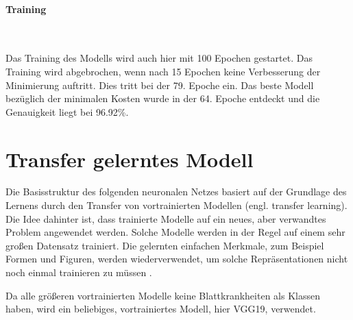\newpage
\paragraph{Training}
~\newline


Das Training des Modells wird auch hier mit 100 Epochen gestartet. Das Training wird abgebrochen, wenn nach 15 Epochen keine Verbesserung der Minimierung auftritt. Dies tritt bei der 79. Epoche ein. Das beste Modell bezüglich der minimalen Kosten wurde in der 64. Epoche entdeckt und die Genauigkeit liegt bei 96.92\%. 


\section{Transfer gelerntes Modell}
\label{sec:transferlearning}


Die Basisstruktur des folgenden neuronalen Netzes basiert auf der Grundlage des Lernens durch den Transfer von vortrainierten Modellen (engl. transfer learning). Die Idee dahinter ist, dass trainierte Modelle auf ein neues, aber verwandtes Problem angewendet werden. Solche Modelle werden in der Regel auf einem sehr großen Datensatz trainiert. Die gelernten einfachen Merkmale, zum Beispiel Formen und Figuren, werden wiederverwendet, um solche Repräsentationen nicht noch einmal trainieren zu müssen \cite{Subramanian2018,natural,Vasilev2019}. 



Da alle größeren vortrainierten Modelle keine Blattkrankheiten als Klassen haben, wird ein beliebiges, vortrainiertes Modell, hier VGG19\cite{VGG16}, verwendet. 

